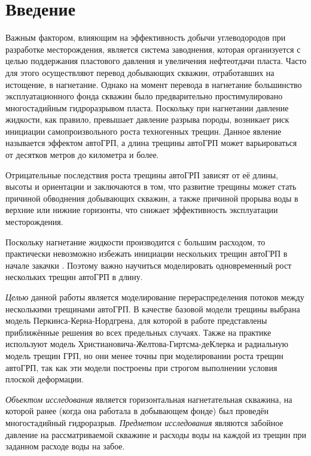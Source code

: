\chapter*{Введение} %


Важным фактором, влияющим на эффективность добычи углеводородов при разработке месторождения, является система заводнения, которая организуется с целью поддержания пластового давления и увеличения нефтеотдачи пласта.
Часто для этого осуществляют перевод добывающих скважин, отработавших на истощение, в нагнетание.
Однако на момент перевода в нагнетание большинство эксплуатационного фонда скважин было предварительно простимулировано многостадийным гидроразрывом пласта.
Поскольку при нагнетании давление жидкости, как правило, превышает давление разрыва породы, возникает риск инициации самопроизвольного роста техногенных трещин.
Данное явление называется эффектом автоГРП, а длина трещины автоГРП может варьироваться от десятков метров до километра и более.

Отрицательные последствия роста трещины автоГРП зависят от её длины, высоты и ориентации и заключаются в том, что развитие трещины может стать причиной обводнения добывающих скважин, а также причиной прорыва воды в верхние или нижние горизонты, что снижает эффективность эксплуатации месторождения.

Поскольку нагнетание жидкости производится с большим расходом, то практически невозможно избежать инициации нескольких трещин автоГРП в начале закачки \cite{baikov_book}.
Поэтому важно научиться моделировать одновременный рост нескольких трещин автоГРП в длину.

\emph{Целью} данной работы является моделирование перераспределения потоков между несколькими трещинами автоГРП.
В качестве базовой модели трещины выбрана модель Перкинса-Керна-Нордгрена, для которой в работе \cite{dontsov2021analysis} представлены приближённые решения во всех предельных случаях.
Также на практике используют модель Христиановича-Желтова-Гиртсма-деКлерка \cite{dontsov1_book} и радиальную модель \cite{dontsov2_book} трещин ГРП, но они менее точны при моделировании роста трещин автоГРП, так как эти модели построены при строгом выполнении условия плоской деформации.

\emph{Объектом исследования} является горизонтальная нагнетательная скважина, на которой ранее (когда она работала в добывающем фонде) был проведён многостадийный гидроразрыв.
\emph{Предметом исследования} являются забойное давление на рассматриваемой скважине и расходы воды на каждой из трещин при заданном расходе воды на забое.

